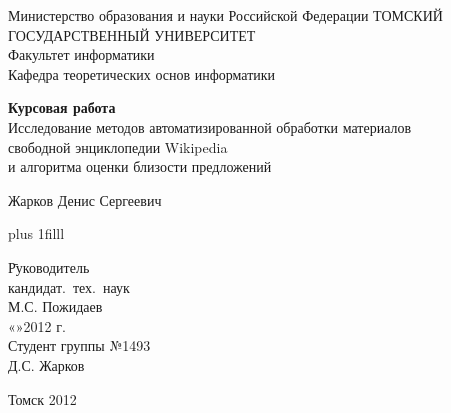 
\thispagestyle{empty}
\begin{center}
Министерство образования и науки Российской Федерации
ТОМСКИЙ ГОСУДАРСТВЕННЫЙ УНИВЕРСИТЕТ\\
Факультет информатики\\
Кафедра теоретических основ информатики\\
\end{center}

\vspace{2cm}

\begin{center}



\vspace{1cm}
{\bf Курсовая работа}\\
\vspace{0.5cm}
Исследование методов автоматизированной обработки материалов \\ 
свободной энциклопедии Wikipedia\\
и алгоритма оценки близости предложений

\vspace{1.0cm}

Жарков Денис Сергеевич


\end{center}

\vskip 0pt plus 1filll

\begin{tabbing}
\hspace{10cm}\=Руководитель\\
\> кандидат.~тех.~наук\\
\>\makebox[3cm]{\hrulefill}М.С. Пожидаев\\
\>«\makebox[0.8cm]{\hrulefill}»\makebox[1.5cm]{\hrulefill}2012 г.\\
\>Студент группы №1493\\
\>\makebox[3cm]{\hrulefill}Д.С. Жарков\\
\end{tabbing}

\vspace*{1cm}

\begin{center}
Томск 2012
\end{center}
